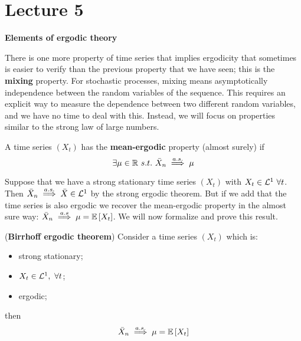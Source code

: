 \section{Lecture 5}
\label{lecture5}

\begin{center}
    \textbf{Elements of ergodic theory}
\end{center}

There is one more property of time series that implies ergodicity that sometimes is easier to verify than the previous property that we have seen; this is the \textbf{mixing} property. For stochastic processes, mixing means asymptotically independence between the random variables of the sequence. This requires an explicit way to measure the dependence between two different random variables, and we have no time to deal with this. Instead, we will focus on properties similar to the strong law of large numbers.

\begin{definition}
    A time series $(X_t)$ has the \textbf{mean-ergodic} property (almost surely) if 
    \[
        \exists\mu\in\R\ s.t.\ \mean{X}_n\impliesas\mu  
    \]
\end{definition}

Suppose that we have a strong stationary time series $(X_t)$ with $X_t\in\mathcal{L}^{1}\ \forall t$. Then $\bar{X}_n\stackrel{a.s.}{\implies}\bar{X}\in\mathcal{L}^{1}$ by the strong ergodic theorem. But if we add that the time series is also ergodic we recover the mean-ergodic property in the almost sure way: $\bar{X}_n\stackrel{a.s}{\implies}\mu=\mathbb{E}\left[X_t\right]$. We will now formalize and prove this result.

\begin{theorem}
    (\textbf{Birrhoff ergodic theorem}) Consider a time series $(X_t)$ which is:
    \begin{itemize}
        \item strong stationary;
        \item $X_t\in\mathcal{L}^{1},\ \forall t$;
        \item ergodic;
    \end{itemize}
    then
    \[
        \bar{X}_n\stackrel{a.s.}{\implies}\mu=\mathbb{E}\left[X_t\right] 
    \]
\end{theorem}

